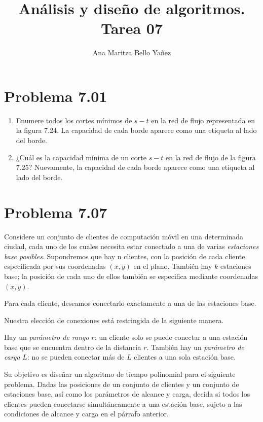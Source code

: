 \documentclass{article}
\begin{document}
\title{Análisis y diseño de algoritmos. \\ Tarea 07}
\author{Ana Maritza Bello Yañez}
\maketitle
\setlength{\parindent}{0pt}
\setlength{\parskip}{1em}

\section*{Problema 7.01}

\begin{enumerate}

\item Enumere todos los cortes mínimos de $s-t$ en la red de flujo representada en
la figura 7.24. La capacidad de cada borde aparece como una etiqueta al lado del
borde.


\item ¿Cuál es la capacidad mínima de un corte $s-t$ en la red de flujo de la
figura 7.25? Nuevamente, la capacidad de cada borde aparece como una etiqueta al
lado del borde.

\end{enumerate}    

\section*{Problema 7.07}

Considere un conjunto de clientes de computación móvil en una determinada
ciudad, cada uno de los cuales necesita estar conectado a una de varias
\textit{estaciones base posibles}. Supondremos que hay n clientes, con la
posición de cada cliente especificada por sus coordenadas $(x, y)$ en el plano.
También hay $k$ estaciones base; la posición de cada uno de ellos también se
especifica mediante coordenadas $(x, y)$.

Para cada cliente, deseamos conectarlo exactamente a una de las estaciones base.

Nuestra elección de conexiones está restringida de la siguiente manera.

Hay un \textit{parámetro de rango} $r$: un cliente solo se puede conectar a una
estación base que se encuentra dentro de la distancia $r$. También hay un
\textit{parámetro de carga} $L$: no se pueden conectar más de $L$ clientes a una
sola estación base.

Su objetivo es diseñar un algoritmo de tiempo polinomial para el siguiente
problema. Dadas las posiciones de un conjunto de clientes y un conjunto de
estaciones base, así como los parámetros de alcance y carga, decida si todos los
clientes pueden conectarse simultáneamente a una estación base, sujeto a las
condiciones de alcance y carga en el párrafo anterior.
\end{document}
